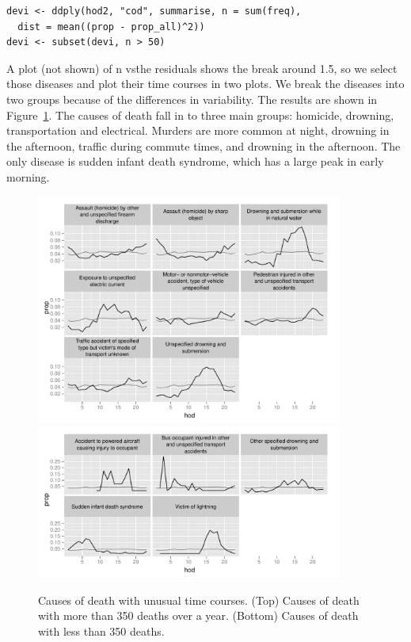 \documentclass[oneside]{article}
\begin{document}
\begin{verbatim}
devi <- ddply(hod2, "cod", summarise, n = sum(freq), 
  dist = mean((prop - prop_all)^2))
devi <- subset(devi, n > 50)
\end{verbatim}

A plot (not shown) of n vs\. the residuals shows the break around 1.5, so we select those diseases and plot their time courses in two plots. We break the diseases into two groups because of the differences in variability. The results are shown in Figure~\ref{fig:disease}. The causes of death fall in to three main groups: homicide, drowning, transportation and electrical. Murders are more common at night, drowning in the afternoon, traffic during commute times, and drowning in the afternoon. The only disease is sudden infant death syndrome, which has a large peak in early morning.

\begin{figure}[htbp]
  \centering
    \includegraphics[width=0.9\textwidth]{case-study/unusual-big}
    \includegraphics[width=0.9\textwidth]{case-study/unusual-sml}
  \caption{Causes of death with unusual time courses.  (Top) Causes of death with more than 350 deaths over a year.  (Bottom) Causes of death with less than 350 deaths.}
  \label{fig:disease}
\end{figure}
\end{document}
